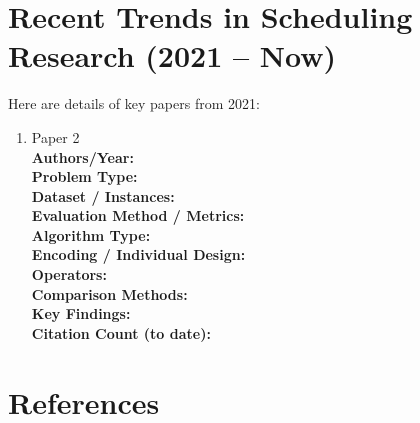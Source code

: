 \documentclass[a4paper,12pt]{article}
\begin{document}
\section{Recent Trends in Scheduling Research (2021 – Now)}
Here are details of key papers from 2021:
\begin{enumerate}[leftmargin=2em, labelwidth=1em, labelsep=0.5em, itemsep=1ex]
  \item Paper 2 \\
    \textbf{Authors/Year:} \\  
    \textbf{Problem Type:} \\  
    \textbf{Dataset / Instances:} \\  
    \textbf{Evaluation Method / Metrics:} \\  
    \textbf{Algorithm Type:} \\  
    \textbf{Encoding / Individual Design:} \\  
    \textbf{Operators:} \\  
    \textbf{Comparison Methods:} \\  
    \textbf{Key Findings:} \\  
    \textbf{Citation Count (to date):} \\[2ex]
\end{enumerate}


\section*{References}


\end{document}

